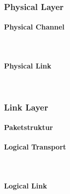 \documentclass[doktyp=barbeit]{TUBAFarbeiten}
\begin{document}
		\subsubsection{Physical Layer}
			\label{sec: le phy}

			\paragraph{Physical Channel} \mbox{} \vspace{0.2cm} \\
				\label{sec: le phy channel}
				

			\paragraph{Physical Link} \mbox{} \vspace{0.2cm} \\
				\label{sec: le phy link}
				

		\subsubsection{Link Layer}
			\label{sec: le ll}

			\paragraph{Paketstruktur}
				\label{sec: le ll paketstruktur}
				

			\paragraph{Logical Transport} \mbox{} \vspace{0.2cm} \\
				\label{sec: le ll transport}
				

			\paragraph{Logical Link} \mbox{} \vspace{0.2cm} \\
				\label{sec: le ll link}
				
\end{document}
